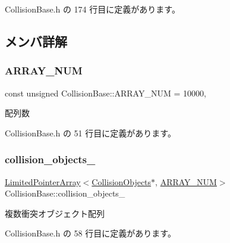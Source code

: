  Collision\+Base.\+h の 174 行目に定義があります。



\subsection{メンバ詳解}
\mbox{\label{class_collision_base_a0ddcdd5ed993b19c6edabd9c50e76ba4}} 
\subsubsection{\texorpdfstring{A\+R\+R\+A\+Y\+\_\+\+N\+UM}{ARRAY\_NUM}}
{\footnotesize\ttfamily const unsigned Collision\+Base\+::\+A\+R\+R\+A\+Y\+\_\+\+N\+UM = 10000\hspace{0.3cm}{\ttfamily [static]}, {\ttfamily [private]}}



配列数 



 Collision\+Base.\+h の 51 行目に定義があります。

\mbox{\label{class_collision_base_a9ef8dfac9a07e31cb1d058b6a22e9640}} 
\subsubsection{\texorpdfstring{collision\+\_\+objects\+\_\+}{collision\_objects\_}}
{\footnotesize\ttfamily \mbox{\hyperlink{class_limited_pointer_array}{Limited\+Pointer\+Array}}$<$\mbox{\hyperlink{class_collision_objects}{Collision\+Objects}}$\ast$, \mbox{\hyperlink{class_collision_base_a0ddcdd5ed993b19c6edabd9c50e76ba4}{A\+R\+R\+A\+Y\+\_\+\+N\+UM}}$>$ Collision\+Base\+::collision\+\_\+objects\+\_\+\hspace{0.3cm}{\ttfamily [private]}}



複数衝突オブジェクト配列 



 Collision\+Base.\+h の 58 行目に定義があります。

